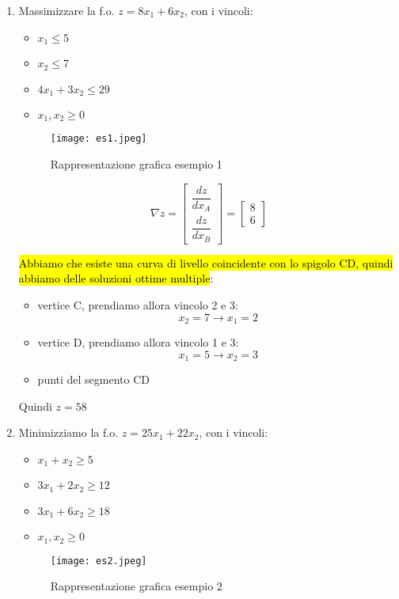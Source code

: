 \begin{enumerate}
	\item Massimizzare la f.o. $z = 8x_1 + 6x_2$, con i vincoli:
		\begin{itemize}
			\item $x_1 \leq 5$
			\item $x_2 \leq 7$
			\item $4x_1 + 3x_2 \leq 29$
			\item $x_1, x_2 \geq 0$
		\end{itemize}
		
		\begin{figure}[H]
		\centering
		\texttt{[image: es1.jpeg]}
		\caption{Rappresentazione grafica esempio 1} 
		\label{rge1}
		\end{figure}
		
		$$\nabla z = \left[\begin{array}{c}
			\dfrac{dz}{dx_A}\\
			\dfrac{dz}{dx_B}
		\end{array}\right] = \left[\begin{array}{c}
			8\\
			6
		\end{array}\right]
		$$
		
		\hl{Abbiamo che esiste una curva di livello coincidente con lo spigolo CD, quindi abbiamo delle soluzioni ottime multiple}:
		\begin{itemize}
			\item vertice C, prendiamo allora vincolo 2 e 3:
				$$x_2 = 7 \to x_1 = 2$$
			
			\item vertice D, prendiamo allora vincolo 1 e 3:
				$$x_1 = 5 \to x_2 = 3$$
		
			\item punti del segmento CD
		\end{itemize}
		
		Quindi $z = 58$
	
	
	\item Minimizziamo la f.o. $z = 25x_1 + 22x_2$, con i vincoli:
		\begin{itemize}
			\item $x_1 + x_2 \geq 5$
			\item $3x_1 + 2x_2 \geq 12$
			\item $3x_1 + 6x_2 \geq 18$
			\item $x_1, x_2 \geq 0$
		\end{itemize}
		
		\begin{figure}[H]
		\centering
		\texttt{[image: es2.jpeg]}
		\caption{Rappresentazione grafica esempio 2} 
		\label{rge2}
		\end{figure}
		

\end{enumerate}
